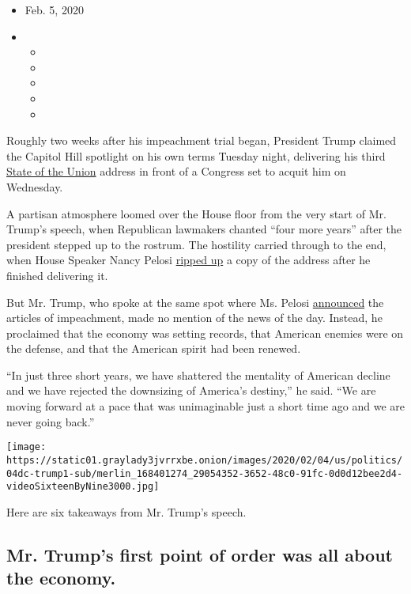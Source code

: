 \begin{itemize}
\item
  Feb. 5, 2020
\item
  \begin{itemize}
  \item
  \item
  \item
  \item
  \item
  \end{itemize}
\end{itemize}

Roughly two weeks after his impeachment trial began, President Trump
claimed the Capitol Hill spotlight on his own terms Tuesday night,
delivering his third
\href{https://www.nytimes3xbfgragh.onion/2020/02/05/podcasts/the-daily/state-of-the-union.html}{State
of the Union} address in front of a Congress set to acquit him on
Wednesday.

A partisan atmosphere loomed over the House floor from the very start of
Mr. Trump's speech, when Republican lawmakers chanted ``four more
years'' after the president stepped up to the rostrum. The hostility
carried through to the end, when House Speaker Nancy Pelosi
\href{https://www.nytimes3xbfgragh.onion/2020/02/04/us/politics/pelosi-trump-handshake.html}{ripped
up} a copy of the address after he finished delivering it.

But Mr. Trump, who spoke at the same spot where Ms. Pelosi
\href{https://www.nytimes3xbfgragh.onion/2019/12/18/us/politics/trump-impeached.html}{announced}
the articles of impeachment, made no mention of the news of the day.
Instead, he proclaimed that the economy was setting records, that
American enemies were on the defense, and that the American spirit had
been renewed.

``In just three short years, we have shattered the mentality of American
decline and we have rejected the downsizing of America's destiny,'' he
said. ``We are moving forward at a pace that was unimaginable just a
short time ago and we are never going back.''

\texttt{[image: https://static01.graylady3jvrrxbe.onion/images/2020/02/04/us/politics/04dc-trump1-sub/merlin\_168401274\_29054352-3652-48c0-91fc-0d0d12bee2d4-videoSixteenByNine3000.jpg]}

Here are six takeaways from Mr. Trump's speech.

\hypertarget{mr-trumps-first-point-of-order-was-all-about-the-economy}{%
\subsection{Mr. Trump's first point of order was all about the
economy.}\label{mr-trumps-first-point-of-order-was-all-about-the-economy}}

